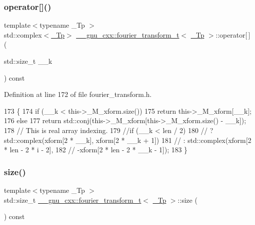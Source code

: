 \subsubsection{\texorpdfstring{operator[]()}{operator[]()}}
{\footnotesize\ttfamily template$<$typename \+\_\+\+Tp $>$ \\
std\+::complex$<$\hyperlink{namespace____gnu__cxx_a3b19a9c800ca194374ef9172290f7d79}{\+\_\+\+Tp}$>$ \hyperlink{class____gnu__cxx_1_1fourier__transform__t}{\+\_\+\+\_\+gnu\+\_\+cxx\+::fourier\+\_\+transform\+\_\+t}$<$ \hyperlink{namespace____gnu__cxx_a3b19a9c800ca194374ef9172290f7d79}{\+\_\+\+Tp} $>$\+::operator\mbox{[}$\,$\mbox{]} (\begin{DoxyParamCaption}\item[{std\+::size\+\_\+t}]{\+\_\+\+\_\+k }\end{DoxyParamCaption}) const\hspace{0.3cm}{\ttfamily [inline]}}



Definition at line 172 of file fourier\+\_\+transform.\+h.


\begin{DoxyCode}
173       \{
174         \textcolor{keywordflow}{if} (\_\_k < this->\_M\_xform.size())
175           \textcolor{keywordflow}{return} this->\_M\_xform[\_\_k];
176         \textcolor{keywordflow}{else}
177           \textcolor{keywordflow}{return} std::conj(this->\_M\_xform[this->\_M\_xform.size() - \_\_k]);
178         \textcolor{comment}{// This is real array indexing.}
179         \textcolor{comment}{//if (\_\_k < len / 2)}
180         \textcolor{comment}{//      ? std::complex(xform[2 * \_\_k], xform[2 * \_\_k + 1])}
181         \textcolor{comment}{//      : std::complex(xform[2 * len - 2 * i - 2],}
182         \textcolor{comment}{//                    -xform[2 * len - 2 * \_\_k - 1]);}
183       \}
\end{DoxyCode}
\mbox{\label{class____gnu__cxx_1_1fourier__transform__t_a667f8cb207f9d8e4c8643fe0bf165ff4}} 
\subsubsection{\texorpdfstring{size()}{size()}}
{\footnotesize\ttfamily template$<$typename \+\_\+\+Tp $>$ \\
std\+::size\+\_\+t \hyperlink{class____gnu__cxx_1_1fourier__transform__t}{\+\_\+\+\_\+gnu\+\_\+cxx\+::fourier\+\_\+transform\+\_\+t}$<$ \hyperlink{namespace____gnu__cxx_a3b19a9c800ca194374ef9172290f7d79}{\+\_\+\+Tp} $>$\+::size (\begin{DoxyParamCaption}{ }\end{DoxyParamCaption}) const\hspace{0.3cm}{\ttfamily [inline]}}



